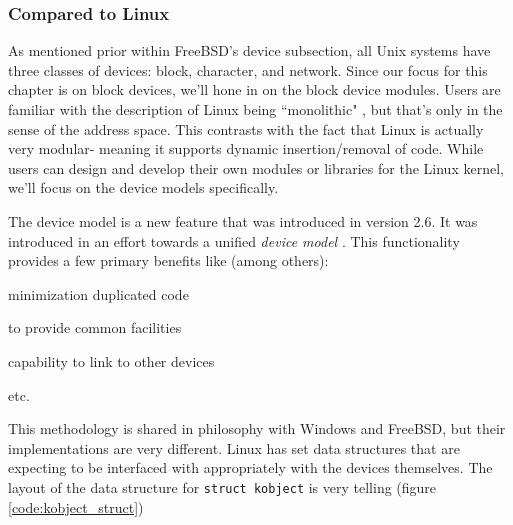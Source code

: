 \subsubsection{Compared to Linux}
\label{sub:Devices Linux}
\par As mentioned prior within FreeBSD's device subsection, all Unix systems have three classes of devices: block, character, and network.
Since our focus for this chapter is on block devices, we'll hone in on the block device modules.
Users are familiar with the description of Linux being ``monolithic" \cite{linux:1}, but that's only in the sense of the address space.
This contrasts with the fact that Linux is actually very modular- meaning it supports dynamic insertion/removal of code.
While users can design and develop their own modules or libraries for the Linux kernel, we'll focus on the device models specifically.

\par The device model is a new feature that was introduced in version 2.6.
It was introduced in an effort towards a unified \textit{device model} \cite{linux:1}.
This functionality provides a few primary benefits like (among others):
\begin{list}{-}{}
\item minimization duplicated code
\item to provide common facilities
\item capability to link to other devices
\item etc.
\end{list}
This methodology is shared in philosophy with Windows and FreeBSD, but their implementations are very different.
Linux has set data structures that are expecting to be interfaced with appropriately with the devices themselves.
The layout of the data structure for \texttt{struct kobject} is very telling (figure \ref{code:kobject_struct})

